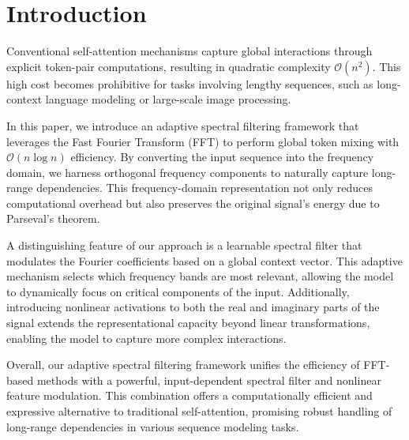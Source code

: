 \section{Introduction}
\label{sec:introduction}
Conventional self-attention mechanisms capture global interactions through explicit token-pair computations, resulting in quadratic complexity \(\mathcal{O}(n^2)\). This high cost becomes prohibitive for tasks involving lengthy sequences, such as long-context language modeling or large-scale image processing.

In this paper, we introduce an adaptive spectral filtering framework that leverages the Fast Fourier Transform (FFT) to perform global token mixing with \(\mathcal{O}(n\log n)\) efficiency. By converting the input sequence into the frequency domain, we harness orthogonal frequency components to naturally capture long-range dependencies. This frequency-domain representation not only reduces computational overhead but also preserves the original signal's energy due to Parseval's theorem.

A distinguishing feature of our approach is a learnable spectral filter that modulates the Fourier coefficients based on a global context vector. This adaptive mechanism selects which frequency bands are most relevant, allowing the model to dynamically focus on critical components of the input. Additionally, introducing nonlinear activations to both the real and imaginary parts of the signal extends the representational capacity beyond linear transformations, enabling the model to capture more complex interactions.

Overall, our adaptive spectral filtering framework unifies the efficiency of FFT-based methods with a powerful, input-dependent spectral filter and nonlinear feature modulation. This combination offers a computationally efficient and expressive alternative to traditional self-attention, promising robust handling of long-range dependencies in various sequence modeling tasks.
